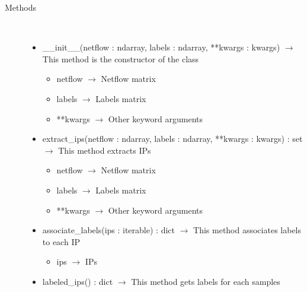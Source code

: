 \begin{description}
\item[Methods] \hfill \\
 \vspace{-1cm}
\begin{itemize}
\item \_\_init\_\_(netflow : ndarray, labels : ndarray, **kwargs : kwargs) $\rightarrow$ This method is the constructor of the class\begin{itemize}
\item netflow $\rightarrow$ Netflow matrix
\item labels $\rightarrow$ Labels matrix
\item **kwargs $\rightarrow$ Other keyword arguments
\end{itemize}

\item extract\_ips(netflow : ndarray, labels : ndarray, **kwargs : kwargs) : set $\rightarrow$ This method extracts IPs\begin{itemize}
\item netflow $\rightarrow$ Netflow matrix
\item labels $\rightarrow$ Labels matrix
\item **kwargs $\rightarrow$ Other keyword arguments
\end{itemize}

\item associate\_labels(ips : iterable) : dict $\rightarrow$ This method associates labels to each IP\begin{itemize}
\item ips $\rightarrow$ IPs
\end{itemize}

\item labeled\_ips() : dict $\rightarrow$ This method gets labels for each samples
\end{itemize}

\end{description}
\hypertarget{datasets::DatasetBuilderInterface}{}
